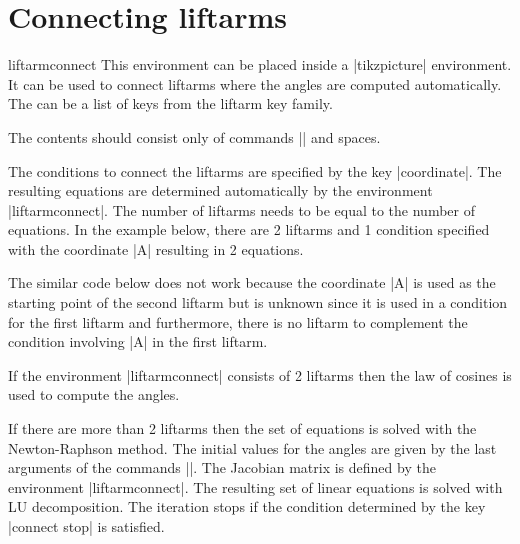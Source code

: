 \documentclass[a4paper,english,dvipsnames]{ltxdoc}
\begin{document}
\section{Connecting liftarms}
\begin{environment}{{liftarmconnect}}
This environment can be placed inside a |tikzpicture| environment. It can be used to connect liftarms where the angles are computed automatically. The  can be a list of keys from the liftarm key family.

The contents should consist only of commands |\liftarm| and spaces.

The conditions to connect the liftarms are specified by the key |coordinate|. The resulting equations are determined automatically by the environment |liftarmconnect|. The number of liftarms needs to be equal to the number of equations. In the example below, there are 2 liftarms and 1 condition specified with the coordinate |A| resulting in 2 equations.
\begin{codeexample}[width=10cm]
\end{codeexample}
The similar code below does not work because the coordinate |A| is used as the starting point of the second liftarm but is unknown since it is used in a condition for the first liftarm and furthermore, there is no liftarm to complement the condition involving |A| in the first liftarm.
\begin{codeexample}
\end{codeexample}
If the environment |liftarmconnect| consists of 2 liftarms then the law of cosines is used to compute the angles.

If there are more than 2 liftarms then the set of equations is solved with the Newton-Raphson method. The initial values for the angles are given by the last arguments of the commands |\liftarm|. The Jacobian matrix is defined by the environment |liftarmconnect|. The resulting set of linear equations is solved with LU decomposition. The iteration stops if the condition determined by the key |connect stop| is satisfied.


\end{environment}
\end{document}
